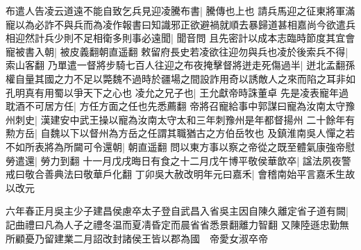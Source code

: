 布遣人告凌云道遠不能自致乞兵見迎凌騰布書|{
	騰傳也上也}
請兵馬迎之征東將軍滿寵以為必詐不與兵而為凌作報書曰知識邪正欲避禍就順去暴歸道甚相嘉尚今欲遣兵相迎然計兵少則不足相衛多則事必遠聞|{
	聞音問}
且先密計以成本志臨時節度其宜會寵被書入朝|{
	被皮義翻朝直遥翻}
敕留府長史若凌欲往迎勿與兵也凌於後索兵不得|{
	索山客翻}
乃單遣一督將步騎七百人往迎之布夜掩擊督將迸走死傷過半|{
	迸北孟翻孫權自量其國之力不足以斃魏不過時於疆場之間設詐用奇以誘敵人之來而陷之耳非如孔明真有用蜀以爭天下之心也}
凌允之兄子也|{
	王允獻帝時誅董卓}
先是凌表寵年過耽酒不可居方任|{
	方任方面之任也先悉薦翻}
帝將召寵給事中郭謀曰寵為汝南太守豫州刺史|{
	漢建安中武王操以寵為汝南太守太和三年刺豫州是年都督揚州}
二十餘年有勲方岳|{
	自魏以下以督州為方岳之任謂其職猶古之方伯岳牧也}
及鎮淮南吳人憚之若不如所表將為所闚可令還朝|{
	朝直遥翻}
問以東方事以察之帝從之既至體氣康強帝慰勞遣還|{
	勞力到翻}
十一月戊戌晦日有食之十二月戊午博平敬侯華歆卒|{
	諡法夙夜警戒曰敬合善典法曰敬華戶化翻}
丁卯吳大赦改明年元曰嘉禾|{
	會稽南始平言嘉禾生故以改元}


六年春正月吳主少子建昌侯慮卒太子登自武昌入省吳主因自陳久離定省子道有闕|{
	記曲禮曰凡為人子之禮冬温而夏凊昏定而晨省省悉景翻離力智翻}
又陳陸遜忠勤無所顧憂乃留建業二月詔改封諸侯王皆以郡為國　帝愛女淑卒帝

